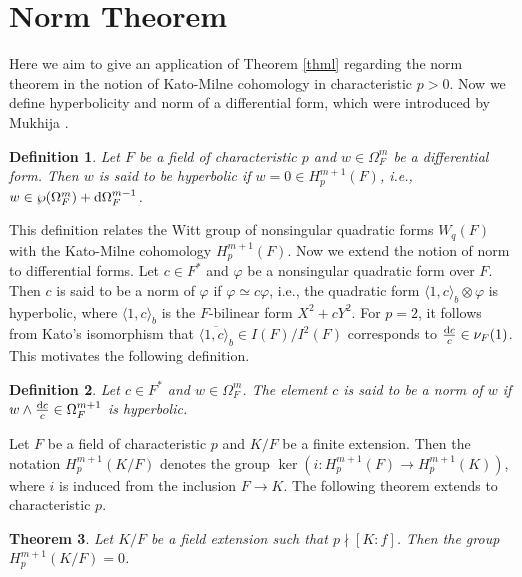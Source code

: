 \documentclass[times,10pt]{amsart}
\newcommand{\dd}{{\rm d}}
\renewcommand{\phi}{\varphi}
\renewcommand{\cong}{\simeq}
\newtheorem{thm}{Theorem}[section]
\newtheorem{defn}[thm]{Definition}%
\begin{document}
           \section{Norm Theorem}\label{5sn}
           
           Here we aim to give an application of Theorem \ref{thml} regarding the norm theorem in the notion of Kato-Milne cohomology in characteristic $p>0$. Now we define hyperbolicity  and  norm of a differential form,  which were  introduced by Mukhija \cite[Definition A.1, A.2]{Appendix}.  
  \begin{defn}
 \label{dfh} Let $F$ be a field of characteristic $p$ and $w\in \Omega_F^m$ be a differential form. Then $w$     is said to be hyperbolic if $w=0\in H_p^{m+1}(F)$, i.e., $w\in \wp(\Omega_F^m)+\dd \Omega_F^{m-1}$.
  \end{defn}
  This definition relates the Witt group of nonsingular quadratic forms  $W_q(F)$ with  the Kato-Milne cohomology $H_p^{m+1}(F)$.  Now we extend the  notion of norm to differential forms.   Let $c\in F^*$ and $\phi$ be a nonsingular quadratic form over $F$. Then $c$ is said to be a norm of $\phi$ if $\phi\cong c\phi$, i.e., the quadratic form $ \langle 1,c \rangle_b\otimes \phi$ is hyperbolic, where $\langle 1,c \rangle_b$ is the  $F$-bilinear form $ X^2+cY^2$. For $p=2$,  it follows from  Kato's isomorphism \cite[Equation (17)]{Appendix}  that $ \overline{\langle 1,c \rangle_b}\in I(F)/I^2(F)$ corresponds to $ \frac{\dd c}{c}\in \nu_F(1) $. This motivates the following definition.
\begin{defn}\label{dn}
     Let $c\in F^*$ and $w\in \Omega_F^m$. The element  $c$ is said to be a norm of $w$ if $w\wedge \frac{\dd c}{c}\in \Omega_F^{m+1}$ is hyperbolic. 
\end{defn}
Let $F$ be a field of characteristic $p$ and $K/F$ be a finite extension. Then the notation $H_p^{m+1}(K/F)$ denotes the group $\ker(i:H_p^{m+1}(F)\xrightarrow{} H_p^{m+1}(K))$, where $i$ is induced from the inclusion $F\xrightarrow{}K$. The following theorem extends \cite[Theorem A.16]{Appendix} to characteristic $p$.
     \begin{thm}\label{thns} Let  $K/F$ be a field extension such that $p\nmid [K:f]$. Then the group   $H_p^{m+1}(K/F)=0$.
          \end{thm}
\end{document}
